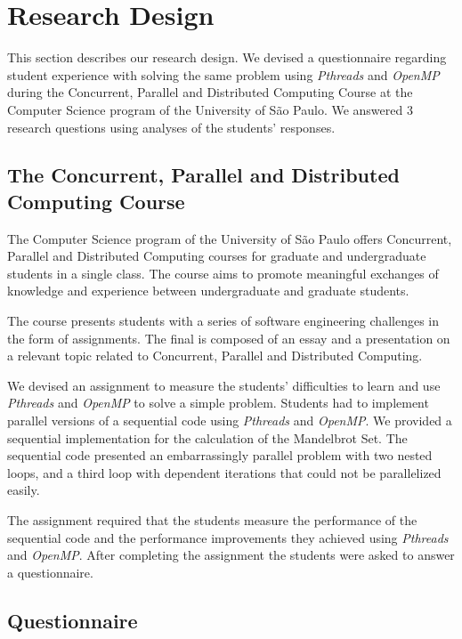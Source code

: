 \section{Research Design}
\label{sec:researchdesign}

This section describes our research design. We devised a questionnaire
regarding student experience with solving the same problem using
\textit{Pthreads} and \textit{OpenMP} during the Concurrent, Parallel and
Distributed Computing Course at the Computer Science program of the University
of São Paulo. We answered 3 research questions using analyses of the students'
responses.

\subsection{The Concurrent, Parallel and Distributed Computing Course}

The Computer Science program of the University of São Paulo offers Concurrent,
Parallel and Distributed Computing courses for graduate and undergraduate
students in a single class. The course aims to promote meaningful exchanges of
knowledge and experience between undergraduate and graduate students.

The course presents students with a series of software engineering challenges
in the form of assignments. The final is composed of an essay and a
presentation on a relevant topic related to Concurrent, Parallel and
Distributed Computing.

We devised an assignment to measure the students' difficulties to
learn and use \textit{Pthreads} and \textit{OpenMP} to solve
a simple problem. Students had to implement parallel versions
of a sequential code using \textit{Pthreads} and \textit{OpenMP}.
We provided a sequential implementation for the calculation of
the Mandelbrot Set. The sequential code presented an embarrassingly
parallel problem with two nested loops, and a third loop with
dependent iterations that could not be parallelized easily.

The assignment required that the students measure the performance of the
sequential code and the performance improvements they achieved using
\textit{Pthreads} and \textit{OpenMP}.  After completing the assignment the
students were asked to answer a questionnaire.

\subsection{Questionnaire}

